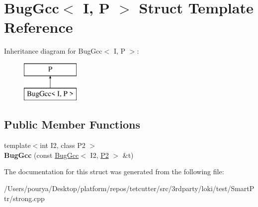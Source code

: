\hypertarget{structBugGcc}{}\section{Bug\+Gcc$<$ I, P $>$ Struct Template Reference}
\label{structBugGcc}
Inheritance diagram for Bug\+Gcc$<$ I, P $>$\+:\begin{figure}[H]
\begin{center}
\leavevmode
\includegraphics[height=2.000000cm]{structBugGcc}
\end{center}
\end{figure}
\subsection*{Public Member Functions}
\begin{DoxyCompactItemize}
\item 
\hypertarget{structBugGcc_a0ddf23a6b0774a1103bda86b0495a8fd}{}{\footnotesize template$<$int I2, class P2 $>$ }\\{\bfseries Bug\+Gcc} (const \hyperlink{structBugGcc}{Bug\+Gcc}$<$ I2, \hyperlink{structP2}{P2} $>$ \&t)\label{structBugGcc_a0ddf23a6b0774a1103bda86b0495a8fd}

\end{DoxyCompactItemize}


The documentation for this struct was generated from the following file\+:\begin{DoxyCompactItemize}
\item 
/\+Users/pourya/\+Desktop/platform/repos/tetcutter/src/3rdparty/loki/test/\+Smart\+Ptr/strong.\+cpp\end{DoxyCompactItemize}
